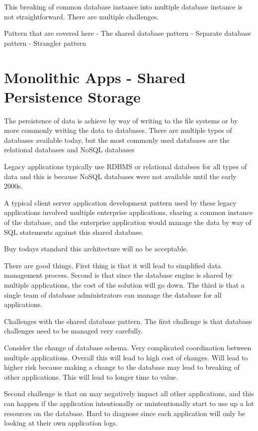 This breaking of common database instance into multiple database instance is not straightforward.
There are multiple challenges.

Pattern that are covered here
- The shared database pattern
- Separate database pattern
- Strangler pattern

\section{Monolithic Apps - Shared Persistence Storage}
The persistence of data is achieve by way of writing to the file systems or by more commonly writing the data to databases.
There are multiple types of databases available today, but the most commonly used databases are the relational databases and NoSQL databases

Legacy applications typically use RDBMS or relational databses for all types of data and this is because NoSQL databases were not available until the early 2000s.

A typical client server application development pattern used by these legacy applications involved multiple enterprise applications, sharing a common instance of the database,
and the enterprise application would manage the data by way of SQL statements against this shared database.

Buy todays standard this architecture will no be acceptable.

There are good things.
First thing is that it will lead to simplified data management process.
Second is that since the database engine is shared by multiple applications, the cost of the solution will go down.
The third is that a single team of database administrators can manage the database for all applications.


Challenges with the shared database pattern.
The first challenge is that database challenges need to be managed very carefully.

Consider the change of database schema.
Very complicated coordination between multiple applications.
Overall this will lead to high cost of changes.
Will lead to higher risk because making a change to the database may lead to breaking of other applications.
This will lead to longer time to value.

Second challenge is that on may negatively impact all other applications, and this can happen if the application intentionally or unintentionally start to use up a lot resources on the database.
Hard to diagnose since each application will only be looking at their own application logs.

